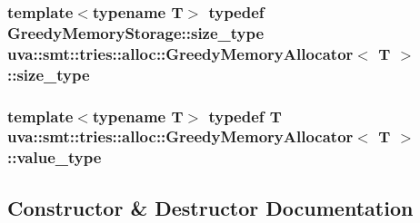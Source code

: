 \subsubsection[{size\+\_\+type}]{\setlength{\rightskip}{0pt plus 5cm}template$<$typename T$>$ typedef {\bf Greedy\+Memory\+Storage\+::size\+\_\+type} {\bf uva\+::smt\+::tries\+::alloc\+::\+Greedy\+Memory\+Allocator}$<$ T $>$\+::{\bf size\+\_\+type}}\label{classuva_1_1smt_1_1tries_1_1alloc_1_1_greedy_memory_allocator_a76d81ff5df20ef0404bb2027016b8b2d}
\hypertarget{classuva_1_1smt_1_1tries_1_1alloc_1_1_greedy_memory_allocator_a11ff94e5a9e23e3db57976661f6d06f8}{}
\subsubsection[{value\+\_\+type}]{\setlength{\rightskip}{0pt plus 5cm}template$<$typename T$>$ typedef T {\bf uva\+::smt\+::tries\+::alloc\+::\+Greedy\+Memory\+Allocator}$<$ T $>$\+::{\bf value\+\_\+type}}\label{classuva_1_1smt_1_1tries_1_1alloc_1_1_greedy_memory_allocator_a11ff94e5a9e23e3db57976661f6d06f8}


\subsection{Constructor \& Destructor Documentation}
\hypertarget{classuva_1_1smt_1_1tries_1_1alloc_1_1_greedy_memory_allocator_ae87e1efb69523a746d42c2bdff324b6a}{}

